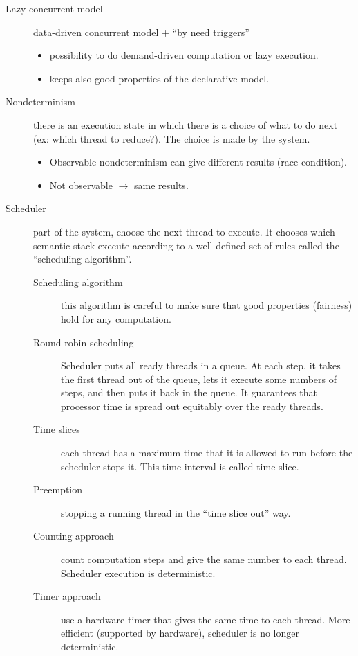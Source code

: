 \begin{description}
  \item[Lazy concurrent model] data-driven concurrent model + ``by need triggers''
    \begin{itemize}
      \item possibility to do demand-driven computation or lazy execution.
      \item keeps also good properties of the declarative model.
    \end{itemize}
  \item[Nondeterminism] there is an execution state in which there is a choice of what to do next (ex: which thread to reduce?).
    The choice is made by the system.
    \begin{itemize}
      \item Observable nondeterminism can give different results (race condition).
      \item Not observable $\rightarrow$ same results.
    \end{itemize}
  \item[Scheduler] part of the system, choose the next thread to execute.
    It chooses which semantic stack execute according to a well defined set of rules called the ``scheduling algorithm''.
    \begin{description}
      \item[Scheduling algorithm] this algorithm is careful to make sure that good properties (fairness) hold for any computation.
      \item[Round-robin scheduling] Scheduler puts all ready threads in a queue.
        At each step, it takes the first thread out of the queue, lets it execute some numbers of steps, and then puts it back in the queue.
        It guarantees that processor time is spread out equitably over the ready threads.
      \item[Time slices] each thread has a maximum time that it is allowed to run before the scheduler stops it.
        This time interval is called time slice.
      \item[Preemption] stopping a running thread in the ``time slice out'' way.
      \item[Counting approach] count computation steps and give the same number to each thread.
        Scheduler execution is deterministic.
      \item[Timer approach] use a hardware timer that gives the same time to each thread.
        More efficient (supported by hardware), scheduler is no longer deterministic.
    \end{description}

\end{description}
